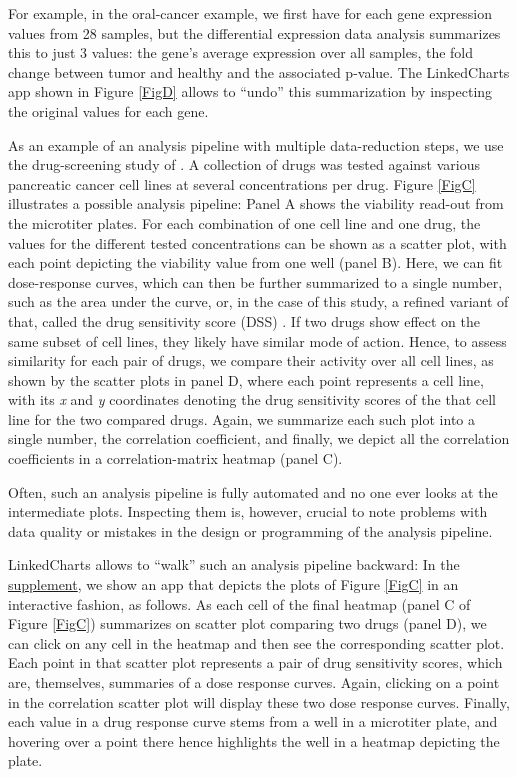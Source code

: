 \documentclass[twocolumn,10pt]{article}
\newcommand{\supplement}{\href{https://anders-biostat.github.io/lc-paper/}{supplement}}
\begin{document}
For example, in the oral-cancer example, we first have for each gene expression values from 28 samples, but the differential expression data analysis summarizes this to just 3 values: the gene's average expression over all samples, the fold change between tumor and healthy and the associated p-value. The LinkedCharts app shown in Figure \ref{FigD} allows to ``undo'' this summarization by inspecting the original values for each gene.

As an example of an analysis pipeline with multiple data-reduction steps, we use the drug-screening study of \citet{he_2018}. A collection of drugs was tested against various pancreatic cancer cell lines at several concentrations per drug. Figure \ref{FigC} illustrates a possible analysis pipeline: Panel A shows the viability read-out from the microtiter plates. For each combination of one cell line and one drug, the values for the different tested concentrations can be shown as a scatter plot, with each point depicting the viability value from one well (panel B). Here, we can fit dose-response curves, which can then be further summarized to a single number, such as the area under the curve, or, in the case of this study, a refined variant of that, called the drug sensitivity score (DSS) \citep{yadav_2014}. If two drugs show effect on the same subset of cell lines, they likely have similar mode of action. Hence, to assess similarity for each pair of drugs, we compare their activity over all cell lines, as shown by the scatter plots in panel D, where each point represents a cell line, with its \emph{x} and \emph{y} coordinates denoting the drug sensitivity scores of the that cell line for the two compared drugs. Again, we summarize each such plot into a single number, the correlation coefficient, and finally, we depict all the correlation coefficients in a correlation-matrix heatmap (panel C).

Often, such an analysis pipeline is fully automated and no one ever looks at the intermediate plots. Inspecting them is, however, crucial to note problems with data quality or mistakes in the design or programming of the analysis pipeline.

LinkedCharts allows to ``walk'' such an analysis pipeline backward: In the \supplement, we show an app that depicts the plots of Figure \ref{FigC} in an interactive fashion, as follows. As each cell of the final heatmap (panel C of Figure \ref{FigC}) summarizes on scatter plot comparing two drugs (panel D), we can click on any cell in the heatmap and then see the corresponding scatter plot. Each point in that scatter plot represents a pair of drug sensitivity scores, which are, themselves, summaries of a dose response curves. Again, clicking on a point in the correlation scatter plot will display these two dose response curves. Finally, each value in a drug response curve stems from a well in a microtiter plate, and hovering over a point there hence highlights the well in a heatmap depicting the plate.
\end{document}
